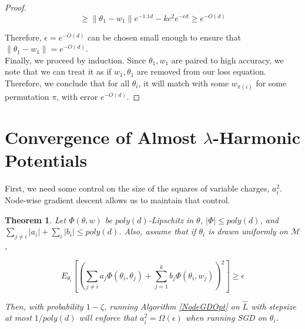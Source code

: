 \documentclass[11pt]{article}
\newtheorem{theorem}{Theorem}[section]
\begin{document}
\begin{proof}
\[\geq \|\theta_1-w_1\|e^{-1.1d} - kc^2e^{-cd} \geq e^{-O(d)}\]

Therefore, $\epsilon = e^{-O(d)}$ can be chosen small enough to ensure that $\|\theta_1 - w_1\| = e^{-O(d)}$. \\

Finally, we proceed by induction. Since $\theta_1, w_1$ are paired to high accuracy, we note that we can treat it as if $w_1, \theta_1$ are removed from our loss equation. Therefore, we conclude that for all $\theta_i$, it will match with some $w_{\pi(i)}$ for some permutation $\pi$, with error $e^{-O(d)}$. 

\end{proof}




\section{Convergence of Almost $\lambda$-Harmonic Potentials}\label{App:EigenFunc}




First, we need some control on the size of the squares of variable charges, $a_i^2$. Node-wise gradient descent allows us to maintain that control.

\begin{theorem}\label{nonDecrease}
Let $\Phi(\theta, w)$ be $poly(d)$-Lipschitz in $\theta$, $|\Phi| \leq poly(d)$, and $\sum_{j \neq i} |a_i| + \sum_i |b_i| \leq poly(d)$. Also, assume that if $\theta_i$ is drawn uniformly on $\mathcal{M}$, 

\[E_{\theta_i}\left[\left(  \sum_{j\neq i} a_j \Phi(\theta_i,\theta_j) + \sum_{j=1}^k b_j \Phi(\theta_i,w_j)\right)^2\right] \geq \epsilon \]

Then, with probability $1-\zeta$, running Algorithm \ref{NodeGDOpt} on $\widehat{L}$ with stepsize at most $1/poly(d)$ will enforce that $a_i^2 = \Omega(\epsilon)$ when running SGD on $\theta_i$.
\end{theorem}
\end{document}
